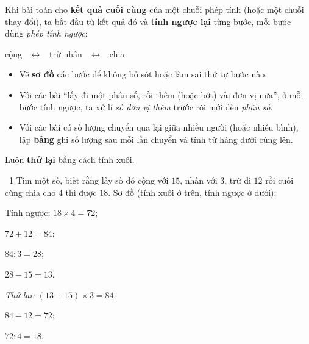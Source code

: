 \begin{knowbox}
Khi bài toán cho \textbf{kết quả cuối cùng} của một chuỗi phép tính (hoặc một chuỗi thay đổi), ta bắt đầu từ kết quả đó và \textbf{tính ngược lại} từng bước, mỗi bước dùng \emph{phép tính ngược}:
\begin{center}
cộng \ $\longleftrightarrow$ \ trừ \qquad\qquad nhân \ $\longleftrightarrow$ \ chia
\end{center}
\begin{itemize}[leftmargin=1.4em,itemsep=3pt]
\item Vẽ \textbf{sơ đồ} các bước để không bỏ sót hoặc làm sai thứ tự bước nào.
\item Với các bài ``lấy đi một phân số, rồi thêm (hoặc bớt) vài đơn vị nữa'', ở mỗi bước tính ngược, ta xử lí \emph{số đơn vị thêm} trước rồi mới đến \emph{phân số}.
\item Với các bài có số lượng chuyển qua lại giữa nhiều người (hoặc nhiều bình), lập \textbf{bảng} ghi số lượng sau mỗi lần chuyển và tính từ hàng dưới cùng lên.
\end{itemize}
Luôn \textbf{thử lại} bằng cách tính xuôi.
\end{knowbox}
\gap
\begin{exbox}{\ExWord\ 1}
Tìm một số, biết rằng lấy số đó cộng với $15$, nhân với $3$, trừ đi $12$ rồi cuối cùng chia cho $4$ thì được $18$.
\guide
Sơ đồ (tính xuôi ở trên, tính ngược ở dưới):
\begin{center}
\end{center}
Tính ngược: $18\times4=72$;\par $72+12=84$;\par $84:3=28$;\par $28-15=13$.\par
\emph{Thử lại:} $(13+15)\times3=84$;\par $84-12=72$;\par $72:4=18$.
\end{exbox}
